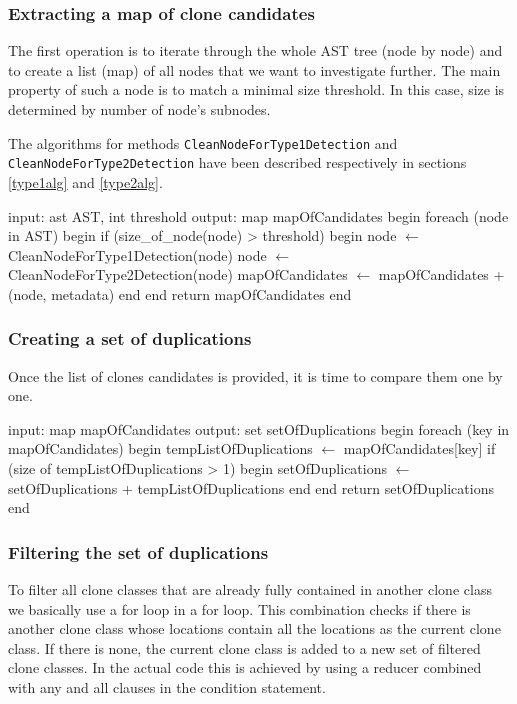 \documentclass{uva-inf-article}
\begin{document}
\subsubsection{Extracting a map of clone candidates}

The first operation is to iterate through the whole AST tree (node by node) and to create a list (map) of all nodes that we want to investigate further. The main property of such a node is to match a minimal size threshold. In this case, size is determined by number of node's subnodes. 

The algorithms for methods \texttt{CleanNodeForType1Detection} and \texttt{CleanNodeForType2Detection} have been described respectively in sections \ref{type1alg} and \ref{type2alg}.

\begin{pseudocode}[caption={Extracting a map of clone candidates.}, label={alg1}]
 input: ast AST, int threshold
 output: map mapOfCandidates
 begin
  foreach (node in AST)
  begin
    if (size_of_node(node)  > threshold)
    begin
        node $\gets$ CleanNodeForType1Detection(node)
        node $\gets$ CleanNodeForType2Detection(node)
        mapOfCandidates $\gets$ mapOfCandidates + (node, metadata)
    end
  end
  return mapOfCandidates
 end       
\end{pseudocode}

\subsubsection{Creating a set of duplications}

Once the list of clones candidates is provided, it is time to compare them one by one.

\begin{pseudocode}[caption={Creating a set of duplications.}, label={alg2}]
 input: map mapOfCandidates
 output: set setOfDuplications
 begin
  foreach (key in mapOfCandidates)
  begin
    tempListOfDuplications $\gets$ mapOfCandidates[key]
    if (size of tempListOfDuplications > 1)
    begin
        setOfDuplications $\gets$ setOfDuplications + tempListOfDuplications
    end
  end
  return setOfDuplications
 end       
\end{pseudocode}

\subsubsection{Filtering the set of duplications}

To filter all clone classes that are already fully contained in another clone class we basically
use a for loop in a for loop. This combination checks if there is another clone class whose locations contain all the locations as the current clone class. If there is none, the current clone class is added to a new set of filtered clone classes.
In the actual code this is achieved by using a reducer combined with any and all clauses in the condition statement.
\end{document}
